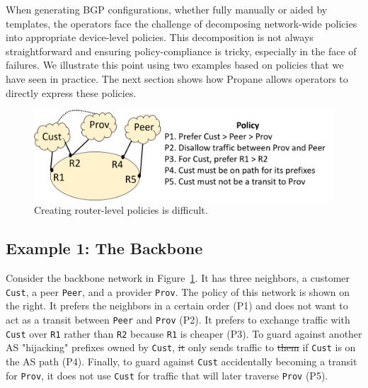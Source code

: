 \documentclass{sig-alternate-10pt}
\newcommand{\sysname}{{\small \sf Propane}\xspace}
\newcommand{\CD}[1]{\texttt{\small #1}}  %
\providecommand{\DIFadd}[1]{{\protect\color{blue}\uwave{#1}}} %
\providecommand{\DIFdel}[1]{{\protect\color{red}\sout{#1}}}                      %
\providecommand{\DIFaddbegin}{} %
\providecommand{\DIFaddend}{} %
\providecommand{\DIFdelbegin}{} %
\providecommand{\DIFdelend}{} %
\begin{document}
When generating BGP configurations, whether fully manually or aided by templates, the operators face the challenge of decomposing network-wide policies
into appropriate device-level policies.
This decomposition is not always straightforward and ensuring policy-compliance is tricky, especially in the face of failures. We illustrate this point using two examples based on policies that we have seen in practice. The next section shows how \sysname allows operators to directly express these policies. 

\DIFaddbegin \begin{figure}[t!]
  \centering
  \includegraphics[width=\columnwidth]{figures/example1}
  \caption{Creating router-level policies is difficult.}
  \label{fig:example1}
  \vspace{-1em}
\end{figure}


\DIFaddend \subsection{Example 1:  The Backbone}

Consider the backbone network in Figure~\ref{fig:example1}. It has
three neighbors, a customer \CD{Cust}, a peer \CD{Peer}, and a provider \CD{Prov}. The policy of this network is shown on the right. It prefers the neighbors in a certain order (P1) and does not want to act as a transit between \CD{Peer} and \CD{Prov} (P2). It prefers to exchange traffic with \CD{Cust} over \CD{R1} rather than \CD{R2} because \CD{R1} is cheaper (P3). To guard against another AS "hijacking" prefixes owned by \CD{Cust}, \DIFdelbegin \DIFdel{it }\DIFdelend \DIFaddbegin \DIFadd{the network }\DIFaddend only sends traffic to \DIFdelbegin \DIFdel{them }\DIFdelend \DIFaddbegin \DIFadd{a neighbor }\DIFaddend if \CD{Cust} is on the AS path (P4). Finally, to guard against \CD{Cust} accidentally becoming a transit for \CD{Prov}, it does not use \CD{Cust} for traffic that will later traverse \CD{Prov} (P5).
\end{document}
